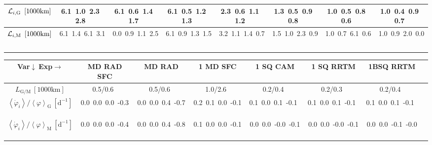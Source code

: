 \begin{table}[H]
{\begin{centering}
\begin{tabular}{|c|c|c|c|c|c|c|c|}
\hline
${\cal L}_{i,\mathrm{G}}\ \left[1000\mathrm{km}\right]$ & \textcolor{C1}{6.1}\ \textcolor{C2}{1.0}\ \textcolor{C3}{2.3}\ \textcolor{C4}{2.8}\  & \textcolor{C1}{6.1}\ \textcolor{C2}{0.6}\ \textcolor{C3}{1.4}\ \textcolor{C4}{1.7}\  & \textcolor{C1}{6.1}\ \textcolor{C2}{0.5}\ \textcolor{C3}{1.2}\ \textcolor{C4}{1.3}\  & \textcolor{C1}{2.3}\ \textcolor{C2}{0.6}\ \textcolor{C3}{1.1}\ \textcolor{C4}{1.2}\  & \textcolor{C1}{1.3}\ \textcolor{C2}{0.5}\ \textcolor{C3}{0.9}\ \textcolor{C4}{0.8}\  & \textcolor{C1}{1.0}\ \textcolor{C2}{0.5}\ \textcolor{C3}{0.8}\ \textcolor{C4}{0.6}\  & \textcolor{C1}{1.0}\ \textcolor{C2}{0.4}\ \textcolor{C3}{0.9}\ \textcolor{C4}{0.7}\  \tabularnewline
\hline
${\cal L}_{i,\mathrm{M}}\ \left[1000\mathrm{km}\right]$ & \textcolor{C1}{6.1}\ \textcolor{C2}{1.4}\ \textcolor{C3}{6.1}\ \textcolor{C4}{3.1}\  & \textcolor{C1}{0.0}\ \textcolor{C2}{0.9}\ \textcolor{C3}{1.1}\ \textcolor{C4}{2.5}\  & \textcolor{C1}{6.1}\ \textcolor{C2}{0.9}\ \textcolor{C3}{1.3}\ \textcolor{C4}{1.5}\  & \textcolor{C1}{3.2}\ \textcolor{C2}{1.1}\ \textcolor{C3}{1.4}\ \textcolor{C4}{0.7}\  & \textcolor{C1}{1.5}\ \textcolor{C2}{1.0}\ \textcolor{C3}{2.3}\ \textcolor{C4}{0.9}\  & \textcolor{C1}{1.0}\ \textcolor{C2}{0.7}\ \textcolor{C3}{6.1}\ \textcolor{C4}{0.6}\  & \textcolor{C1}{1.0}\ \textcolor{C2}{0.9}\ \textcolor{C3}{2.0}\ \textcolor{C4}{0.0}\  \tabularnewline
\hline
 &  &  &  &  &  &  & \tabularnewline
\hline
\end{tabular}
\begin{tabular}{|c|c|c|c|c|c|c|c|}
\hline
Var$\downarrow\ $Exp$\rightarrow$ & MD RAD SFC & MD RAD & 1 MD SFC & 1 SQ CAM & 1 SQ RRTM & 1BSQ RRTM \tabularnewline
\hline
\hline
$L_{\mathrm{G/M}}\ \left[1000\mathrm{km}\right]$ & 0.5/0.6\ & 0.5/0.6\ & 1.0/2.6\ & 0.2/0.4\ & 0.2/0.3\ & 0.2/0.4\ \tabularnewline
\hline
$\left\langle \dot{\varphi}_{i}\right\rangle /\left\langle \varphi\right\rangle _{\mathrm{G}}\ \left[\mathrm{d^{-1}}\right]$ & \textcolor{C1}{0.0}\ \textcolor{C2}{0.0}\ \textcolor{C3}{0.0}\ \textcolor{C4}{-0.3}\  & \textcolor{C1}{0.0}\ \textcolor{C2}{0.0}\ \textcolor{C3}{0.4}\ \textcolor{C4}{-0.7}\  & \textcolor{C1}{0.2}\ \textcolor{C2}{0.1}\ \textcolor{C3}{0.0}\ \textcolor{C4}{-0.1}\  & \textcolor{C1}{0.1}\ \textcolor{C2}{0.0}\ \textcolor{C3}{0.1}\ \textcolor{C4}{-0.1}\  & \textcolor{C1}{0.1}\ \textcolor{C2}{0.0}\ \textcolor{C3}{0.1}\ \textcolor{C4}{-0.1}\  & \textcolor{C1}{0.1}\ \textcolor{C2}{0.0}\ \textcolor{C3}{0.1}\ \textcolor{C4}{-0.1}\  \tabularnewline
\hline
$\left\langle \dot{\varphi}_{i}\right\rangle /\left\langle \varphi\right\rangle _{\mathrm{M}}\ \left[\mathrm{d^{-1}}\right]$ & \textcolor{C1}{0.0}\ \textcolor{C2}{0.0}\ \textcolor{C3}{0.0}\ \textcolor{C4}{-0.4}\  & \textcolor{C1}{0.0}\ \textcolor{C2}{0.0}\ \textcolor{C3}{0.4}\ \textcolor{C4}{-0.8}\  & \textcolor{C1}{0.1}\ \textcolor{C2}{0.0}\ \textcolor{C3}{0.0}\ \textcolor{C4}{-0.1}\  & \textcolor{C1}{0.0}\ \textcolor{C2}{0.0}\ \textcolor{C3}{-0.0}\ \textcolor{C4}{-0.1}\  & \textcolor{C1}{0.0}\ \textcolor{C2}{0.0}\ \textcolor{C3}{-0.0}\ \textcolor{C4}{-0.1}\  & \textcolor{C1}{0.0}\ \textcolor{C2}{0.0}\ \textcolor{C3}{-0.1}\ \textcolor{C4}{-0.0}\  \tabularnewline

\end{tabular}
\end{centering}}
\end{table}
